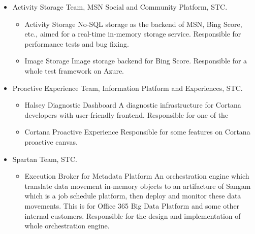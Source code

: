 \documentclass[10pt,a4paper,roman]{moderncv} %
\begin{document}
        {\begin{itemize}%
         \item Activity Storage Team, MSN Social and Community Platform, STC.
               \begin{itemize}%
               \item Activity Storage\newline{}%
                     No-SQL storage as the backend of MSN, Bing Score, etc., aimed for a real-time in-memory storage service.\newline{}%
                     Responsible for performance tests and bug fixing.
               \item Image Storage\newline{}%
                     Image storage backend for Bing Score.\newline{}%
                     Responsible for a whole test framework on Azure.
               \end{itemize}
         \item Proactive Experience Team, Information Platform and Experiences, STC.
               \begin{itemize}%
               \item Halsey Diagnostic Dashboard\newline{}%
                     A diagnostic infrastructure for Cortana developers with user-friendly frontend.
                     Responsible for one of the 
               \item Cortana Proactive Experience\newline{}%
                     Responsible for some features on Cortana proactive canvas.
               \end{itemize}
         \item Spartan Team, STC.
               \begin{itemize}%
               \item Execution Broker for Metadata Platform\newline{}%
                     An orchestration engine which translate data movement in-memory objects to an artifacture of Sangam which is a job schedule platform, then deploy and monitor these data movements. This is for Office 365 Big Data Platform and some other internal customers.
                     Responsible for the design and implementation of whole orchestration engine.
               \end{itemize}
         \end{itemize}}
\end{document}
